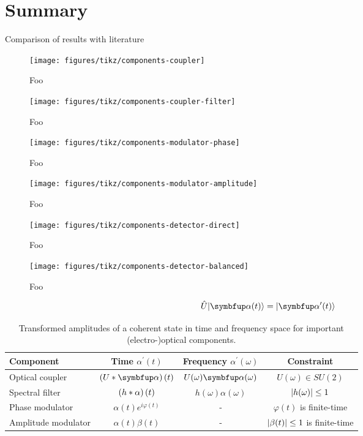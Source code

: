 \section*{Summary}

Comparison of results with literature

\begin{figure}[htb]
    \centering
    \texttt{[image: figures/tikz/components-coupler]}
    \caption{Foo}
\end{figure}

\begin{figure}[htb]
    \centering
    \texttt{[image: figures/tikz/components-coupler-filter]}
    \caption{Foo}
\end{figure}

\begin{figure}[htb]
    \centering
    \texttt{[image: figures/tikz/components-modulator-phase]}
    \caption{Foo}
\end{figure}

\begin{figure}[htb]
    \centering
    \texttt{[image: figures/tikz/components-modulator-amplitude]}
    \caption{Foo}
\end{figure}

\begin{figure}[htb]
    \centering
    \texttt{[image: figures/tikz/components-detector-direct]}
    \caption{Foo}
\end{figure}

\begin{figure}[htb]
    \centering
    \texttt{[image: figures/tikz/components-detector-balanced]}
    \caption{Foo}
\end{figure}

\begin{equation}
	\hat{U}
	\ket{\vb{\alpha}(t)}
	=
	\ket{\vb{\alpha}^\prime(t)}
\end{equation}


\begin{table}[htb]
	\centering	
	\begin{tabular}{lccc}
		\toprule
			Component & Time $\alpha^\prime(t)$ & Frequency $\alpha^\prime(\omega)$ & Constraint \\
		\midrule
			Optical coupler & $\left(U\conv\vb{\alpha}\right)(t)$ & $U(\omega)\vb{\alpha}(\omega)$ & $U(\omega)\in SU(2)$ \\
			Spectral filter & $\left(h\ast\alpha\right)(t)$ & $h(\omega)\alpha(\omega)$ & $\lvert h(\omega)\rvert\leq1$ \\
			Phase modulator & $\alpha(t)e^{i\varphi(t)}$ & - & $\varphi(t)$ is finite-time \\
			Amplitude modulator & $\alpha(t)\beta(t)$ & - & $\lvert\beta(t)\rvert\leq1$ is finite-time \\
		\bottomrule
	\end{tabular}
	\caption{Transformed amplitudes of a coherent state in time and frequency space for important (electro-)optical components.}
\end{table}

